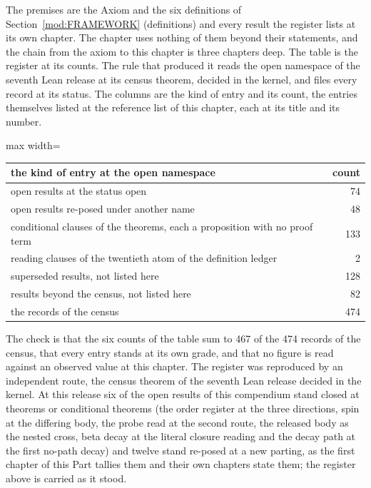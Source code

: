 \begin{chproof}[instrument]
The premises are the Axiom and the six definitions of Section~\ref{mod:FRAMEWORK} (definitions) and every result the register lists at its own chapter. The chapter uses nothing of them beyond their statements, and the chain from the axiom to this chapter is three chapters deep.
The table is the register at its counts. The rule that produced it reads the open namespace of the seventh Lean release at its census theorem, decided in the kernel, and files every record at its status. The columns are the kind of entry and its count, the entries themselves listed at the reference list of this chapter, each at its title and its number.
\begin{center}
\begin{adjustbox}{max width=\linewidth}\begin{tabular}{lr}
\hline
the kind of entry at the open namespace & count \\
\hline
open results at the status open & 74 \\
open results re-posed under another name & 48 \\
conditional clauses of the theorems, each a proposition with no proof term & 133 \\
reading clauses of the twentieth atom of the definition ledger & 2 \\
superseded results, not listed here & 128 \\
results beyond the census, not listed here & 82 \\
\hline
the records of the census & 474 \\
\hline
\end{tabular}\end{adjustbox}
\end{center}
The check is that the six counts of the table sum to 467 of the 474 records of the census, that every entry stands at its own grade, and that no figure is read against an observed value at this chapter.
The register was reproduced by an independent route, the census theorem of the seventh Lean release decided in the kernel. At this release six of the open results of this compendium stand closed at theorems or conditional theorems (the order register at the three directions, spin at the differing body, the probe read at the second route, the released body as the nested cross, beta decay at the literal closure reading and the decay path at the first no-path decay) and twelve stand re-posed at a new parting, as the first chapter of this Part tallies them and their own chapters state them; the register above is carried as it stood.
\end{chproof}

